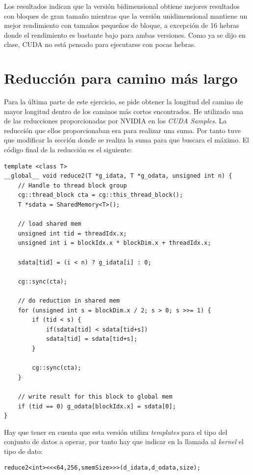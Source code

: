 Los resultados indican que la versión bidimensional obtiene mejores resultados con bloques de gran tamaño mientras que la versión unidimensional mantiene un mejor rendimiento con tamaños pequeños de bloque, a excepción de 16 hebras donde el rendimiento es bastante bajo para ambas versiones. Como ya se dijo en clase, CUDA no está pensado para ejecutarse con pocas hebras.

\section{Reducción para camino más largo}
Para la última parte de este ejercicio, se pide obtener la longitud del camino de mayor longitud dentro de los caminos más cortos encontrados. He utilizado una de las reducciones proporcionadas por NVIDIA en los \textit{CUDA Samples}. La reducción que ellos proporcionaban era para realizar una suma. Por tanto tuve que modificar la sección donde se realiza la suma para que buscara el máximo. El código final de la reducción es el siguiente:

\begin{verbatim}
template <class T>
__global__ void reduce2(T *g_idata, T *g_odata, unsigned int n) {
	// Handle to thread block group
	cg::thread_block cta = cg::this_thread_block();
	T *sdata = SharedMemory<T>();
	
	// load shared mem
	unsigned int tid = threadIdx.x;
	unsigned int i = blockIdx.x * blockDim.x + threadIdx.x;
	
	sdata[tid] = (i < n) ? g_idata[i] : 0;
	
	cg::sync(cta);
	
	// do reduction in shared mem
	for (unsigned int s = blockDim.x / 2; s > 0; s >>= 1) {
		if (tid < s) {
			if(sdata[tid] < sdata[tid+s])
			sdata[tid] = sdata[tid+s];
		}
		
		cg::sync(cta);
	}
	
	// write result for this block to global mem
	if (tid == 0) g_odata[blockIdx.x] = sdata[0];
}
\end{verbatim}

Hay que tener en cuenta que esta versión utiliza \textit{templates} para el tipo del conjunto de datos a operar, por tanto hay que indicar en la llamada al \textit{kernel} el tipo de dato:

\begin{verbatim}
reduce2<int><<<64,256,smemSize>>>(d_idata,d_odata,size);
\end{verbatim}


